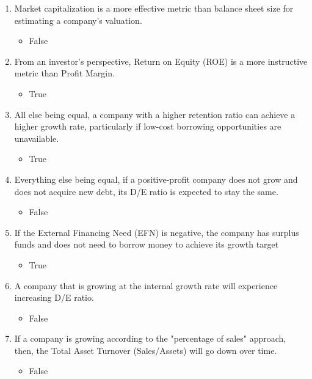 \begin{scriptsize}
\begin{enumerate}[itemsep=0em]
    \item Market capitalization is a more effective metric than balance sheet size for estimating a company's valuation.
          \begin{itemize}[itemsep=0em]
            \item False
          \end{itemize}
    \item From an investor's perspective, Return on Equity (ROE) is a more instructive metric than Profit Margin.
          \begin{itemize}[itemsep=0em]
            \item True
          \end{itemize}
    \item All else being equal, a company with a higher retention ratio can achieve a higher growth rate, particularly if low-cost borrowing opportunities are unavailable.
          \begin{itemize}[itemsep=0em]
            \item True
          \end{itemize}
    \item Everything else being equal, if a positive-profit company does not grow and does not acquire new debt, its D/E ratio is expected to stay the same.
          \begin{itemize}[itemsep=0em]
            \item False
          \end{itemize}
    \item If the External Financing Need (EFN) is negative, the company has surplus funds and does not need to borrow money to achieve its growth target
          \begin{itemize}[itemsep=0em]
            \item True
          \end{itemize}
    \item A company that is growing at the internal growth rate will experience increasing D/E ratio.
          \begin{itemize}[itemsep=0em]
            \item False
          \end{itemize}
    \item If a company is growing according to the "percentage of sales" approach, then, the Total Asset Turnover (Sales/Assets) will go down over time.
          \begin{itemize}[itemsep=0em]
            \item False

\end{itemize}
\end{enumerate}
\end{scriptsize}
